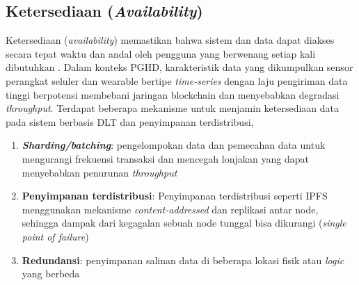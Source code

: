 \subsection{Ketersediaan (\textit{Availability})}\label{studi-availability}
Ketersediaan (\textit{availability}) memastikan bahwa sistem dan data dapat diakses secara tepat waktu dan andal oleh pengguna yang berwenang setiap kali dibutuhkan \parencite{tripathi2025cia}.
Dalam konteks PGHD, karakteristik data yang dikumpulkan sensor perangkat seluler dan wearable bertipe \textit{time-series} dengan laju pengiriman data tinggi berpotensi membebani jaringan blockchain dan menyebabkan degradasi \textit{throughput}.
Terdapat beberapa mekanisme untuk menjamin ketersediaan data pada sistem berbasis DLT dan penyimpanan terdistribusi,
\begin{enumerate}
    \item \textbf{\textit{Sharding/batching}}: pengelompokan data dan pemecahan data untuk mengurangi frekuensi transaksi dan mencegah lonjakan yang dapat menyebabkan penurunan \textit{throughput} \parencite{Haque_2024_Performance_Blockchain}

    \item \textbf{Penyimpanan terdistribusi}: Penyimpanan terdistribusi seperti IPFS menggunakan mekanisme \textit{content-addressed} dan replikasi antar node, sehingga dampak dari kegagalan sebuah node tunggal bisa dikurangi (\textit{single point of failure}) \parencite{Haque_2024_Performance_Blockchain} 
    
    \item \textbf{Redundansi}: penyimpanan salinan data di beberapa lokasi fisik atau \textit{logic} yang berbeda \parencite{tripathi2025cia}
    

\end{enumerate}

